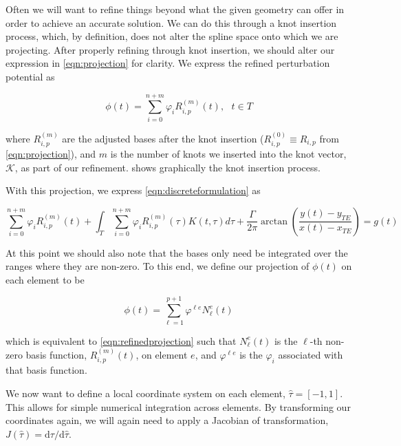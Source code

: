 Often we will want to refine things beyond what the given geometry can offer in order to achieve an accurate solution. We can do this through a knot insertion process, which, by definition, does not alter the spline space onto which we are projecting. After properly refining through knot insertion, we should alter our expression in \cref{eqn:projection} for clarity. We express the refined perturbation potential as

\begin{equation}
\label{eqn:refinedprojection}
\phi(t) = \sum_{i=0}^{n+m}\varphi_i R_{i,p}^{(m)}(t),~~~t \in T
\end{equation}

\noindent where $R_{i,p}^{(m)}$ are the adjusted bases after the knot insertion ($R_{i,p}^{(0)} \equiv R_{i,p}$ from \cref{eqn:projection}), and $m$ is the number of knots we inserted into the knot vector, $\mathcal{K}$, as part of our refinement.  shows graphically the knot insertion process.

With this projection, we express \cref{eqn:discreteformulation} as

\begin{equation}
\label{eqn:discrete1}
\sum_{i=0}^{n+m}\varphi_i R_{i,p}^{(m)}(t) + \int_{T} \sum_{i=0}^{n+m}\varphi_i R_{i,p}^{(m)}(\tau) K(t,\tau) d\tau + \frac{\Gamma}{2\pi} \arctan\left( \frac{y(t) - y_{TE}}{x(t)-x_{TE}} \right) = g(t)
\end{equation}

\noindent At this point we should also note that the bases only need be integrated over the ranges where they are non-zero. To this end, we define our projection of \(\phi(t)\) on each element to be

\begin{equation}
\label{eqn:elementprojection}
\phi(t) = \sum_{\ell=1}^{p+1}\varphi^{\ell e} N_{\ell}^{e}(t)
\end{equation}

\noindent which is equivalent to \cref{eqn:refinedprojection} such that \(N_{\ell}^{e}(t)\) is the \(\ell\)-th non-zero basis function, \(R_{i,p}^{(m)}(t)\), on element $e$, and \(\varphi^{\ell e}\) is the \(\varphi_i\) associated with that basis function.

We now want to define a local coordinate system on each element, \(\hat{\tau} = [-1,1]\). This allows for simple numerical integration across elements. By transforming our coordinates again, we will again need to apply a Jacobian of transformation, \(J(\hat{\tau}) = \text{d}\tau/\text{d}\hat{\tau} \).

